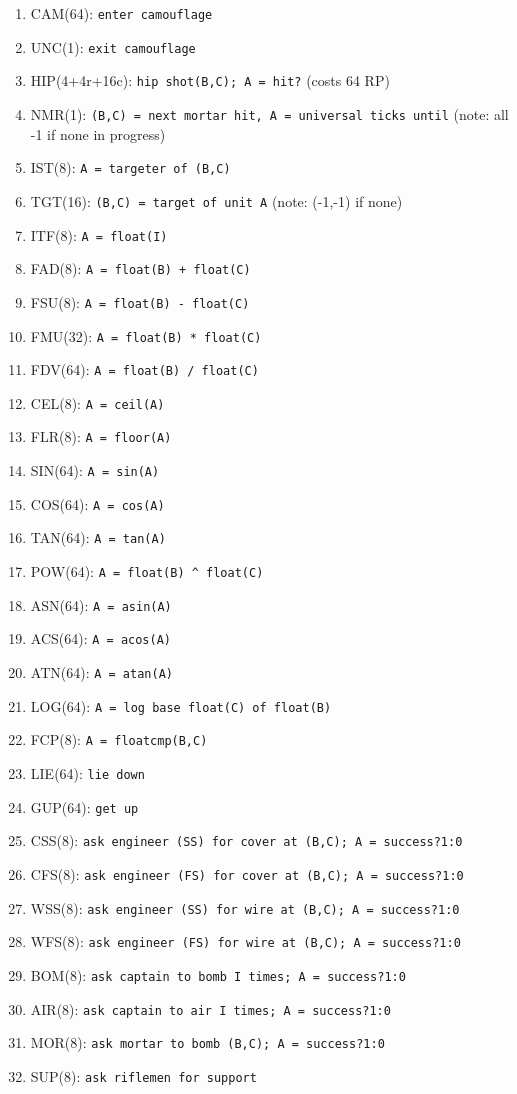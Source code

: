 \documentclass{article}
\begin{document}
\begin{enumerate}[noitemsep]
    \item CAM(64): \texttt{enter camouflage}
    \item UNC(1): \texttt{exit camouflage}
    \item HIP(4+4r+16c): \texttt{hip shot(B,C); A = hit?} (costs 64 RP)
    \item NMR(1): \texttt{(B,C) = next mortar hit, A = universal ticks until}
        (note: all -1 if none in progress)
    \item IST(8): \texttt{A = targeter of (B,C)}
    \item TGT(16): \texttt{(B,C) = target of unit A} (note: (-1,-1) if none)
    \item ITF(8): \texttt{A = float(I)}
    \item FAD(8): \texttt{A = float(B) + float(C)}
    \item FSU(8): \texttt{A = float(B) - float(C)}
    \item FMU(32): \texttt{A = float(B) * float(C)}
    \item FDV(64): \texttt{A = float(B) / float(C)}
    \item CEL(8): \texttt{A = ceil(A)}
    \item FLR(8): \texttt{A = floor(A)}
    \item SIN(64): \texttt{A = sin(A)}
    \item COS(64): \texttt{A = cos(A)}
    \item TAN(64): \texttt{A = tan(A)}
    \item POW(64): \texttt{A = float(B) \^{} float(C)}
    \item ASN(64): \texttt{A = asin(A)}
    \item ACS(64): \texttt{A = acos(A)}
    \item ATN(64): \texttt{A = atan(A)}
    \item LOG(64): \texttt{A = log base float(C) of float(B)}
    \item FCP(8): \texttt{A = floatcmp(B,C)}
    \item LIE(64): \texttt{lie down}
    \item GUP(64): \texttt{get up}
    \item CSS(8): \texttt{ask engineer (SS) for cover at (B,C); A = success?1:0}
    \item CFS(8): \texttt{ask engineer (FS) for cover at (B,C); A = success?1:0}
    \item WSS(8): \texttt{ask engineer (SS) for wire at (B,C); A = success?1:0}
    \item WFS(8): \texttt{ask engineer (FS) for wire at (B,C); A = success?1:0}
    \item BOM(8): \texttt{ask captain to bomb I times; A = success?1:0}
    \item AIR(8): \texttt{ask captain to air I times; A = success?1:0}
    \item MOR(8): \texttt{ask mortar to bomb (B,C); A = success?1:0}
    \item SUP(8): \texttt{ask riflemen for support}
\end{enumerate}
\end{document}
